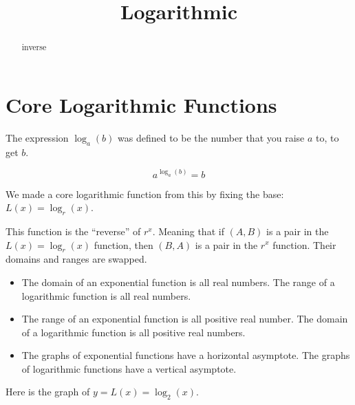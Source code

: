 \documentclass{ximera}
\title{Logarithmic}
\begin{document}
\begin{abstract}
inverse
\end{abstract}
\maketitle


\section*{Core Logarithmic Functions}




The expression $\log_a(b)$ was defined to be the number that you raise $a$ to, to get $b$.

\[   a^{\log_a(b)} = b  \]




We made a core logarithmic function from this by fixing the base:  $L(x) = \log_r(x)$. 


This function is the ``reverse'' of $r^x$.  Meaning that if $(A, B)$ is a pair in the $L(x) = \log_r(x)$ function, then $(B, A)$ is a pair in the $r^x$ function. Their domains and ranges are swapped. 





\begin{itemize}

\item The domain of an exponential function is all real numbers. The range of a logarithmic function is all real numbers.  


\item The range of an exponential function is all positive real number. The domain of a logarithmic function is all positive real numbers.

\item The graphs of exponential functions have a horizontal asymptote. The graphs of logarithmic functions have a vertical asymptote. 

\end{itemize}






Here is the graph of $y = L(x) = \log_2(x)$.
\end{document}
